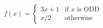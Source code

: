 \documentclass[preview]{standalone}
\begin{document}
\begin{align*}
f(x) =\begin{cases}3x + 1 & \text{if } x \text{ is ODD}\\x / 2 & \text{otherwise}\end{cases}
\end{align*}
\end{document}
